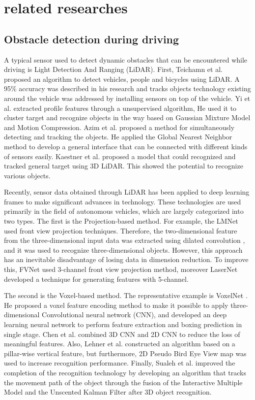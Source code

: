 \documentclass{ieeeaccess}
\begin{document}
\section{related researches}
\label{sec:related researches}
\subsection{Obstacle detection during driving}
\label{subsec: obstacle deteciton}
A typical sensor used to detect dynamic obstacles that can be encountered while driving is Light Detection And Ranging (LiDAR). First, Teichamn et al.\cite{b09} proposed an algorithm to detect vehicles, people and bicycles using LiDAR. A 95\% accuracy was described in his research and tracks objects technology existing around the vehicle was addressed by installing sensors on top of the vehicle. Yi et al.\cite{b10} extracted profile features through a unsupervised algorithm, He used it to cluster target and recognize objects in the way based on Gaussian Mixture Model and Motion Compression. Azim et al.\cite{b11} proposed a method for simultaneously detecting and tracking the objects. He applied the Global Nearest Neighbor method to develop a general interface that can be connected with different kinds of sensors easily. Kaestner et al.\cite{b12} proposed a model that could recognized and tracked general target using 3D LiDAR. This showed the potential to recognize various objects.

Recently, sensor data obtained through LiDAR has been applied to deep learning frames to make significant advances in technology. These technologies are used primarily in the field of autonomous vehicles, which are largely categorized into two types. The first is the Projection-based method. For example, the LMNet\cite{b13} used front view projection techniques. Therefore, the two-dimensional feature from the three-dimensional input data was extracted using dilated convolution \cite{b14}, and it was used to recognize three-dimensional objects. However, this approach has an inevitable disadvantage of losing data in dimension reduction. To improve this, FVNet\cite{b15} used 3-channel front view projection method, moreover LaserNet\cite{b16} developed a technique for generating features with 5-channel.

The second is the Voxel-based method. The representative example is VoxelNet \cite{b17}. He proposed a voxel feature encoding method to make it possible to apply three-dimensional Convolutional neural network (CNN), and developed an deep learning neural network to perform feature extraction and boxing prediction in single stage. Chen et al.\cite{b19} combined 3D CNN and 2D CNN to reduce the loss of meaningful features. Also, Lehner et al.\cite{b20} constructed an algorithm based on a pillar-wise vertical feature, but furthermore, 2D Pseudo Bird Eye View map was used to increase recognition performance. Finally, Sualeh et al.\cite{b21} improved the completion of the recognition technology by developing an algorithm that tracks the movement path of the object through the fusion of the Interactive Multiple Model and the Unscented Kalman Filter\cite{b22} after 3D object recognition.
\end{document}
